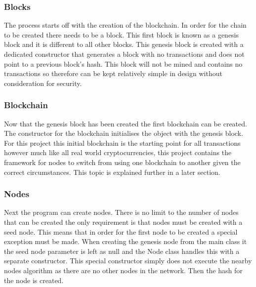 \documentclass{l4proj}
\begin{document}
\subsubsection{Blocks}
The process starts off with the creation of the blockchain. In order for the chain to be created there needs to be
a block. This first block is known as a genesis block and it is different to all other blocks. This genesis block
is created with a dedicated constructor that generates a block with no transactions and does not point to a previous
block's hash. This block will not be mined and contains no transactions so therefore can be kept relatively simple
in design without consideration for security. 

\subsubsection{Blockchain}
Now that the genesis block has been created the first blockchain can be created. The constructor for the blockchain
initialises the object with the genesis block. For this project this initial blockchain is the starting point for
all transactions however much like all real world cryptocurrencies, this project contains the framework for 
nodes to switch from using one blockchain to another given the correct circumstances. This topic is explained further
in a later section.

\subsubsection{Nodes}
Next the program can create nodes. There is no limit to the number of nodes that can be created the only 
requirement is that nodes must be created with a seed node. This means that in order for the first node to be created
a special exception must be made. When creating the genesis node from the main class it the seed node parameter
is left as null and the Node class handles this with a separate constructor. This special constructor simply
does not execute the nearby nodes algorithm as there are no other nodes in the network. Then the hash for the 
node is created. 
\end{document}
